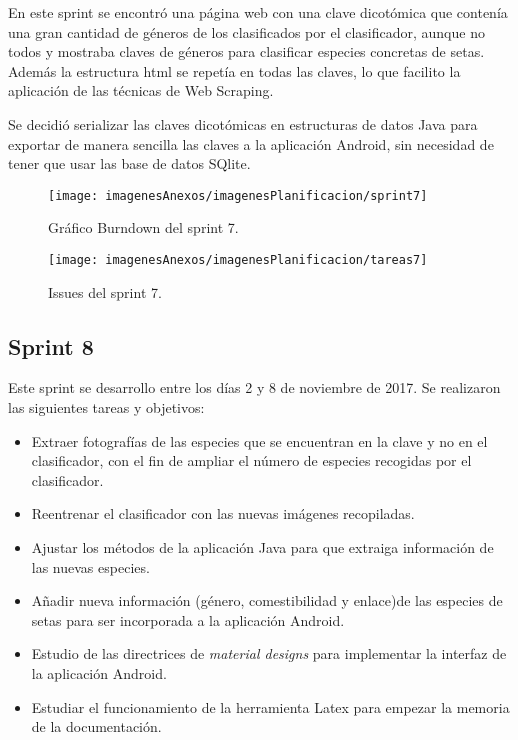 En este sprint se encontró una página web con una clave dicotómica que contenía una gran cantidad de géneros de los clasificados por el clasificador, aunque no todos y mostraba claves de géneros para clasificar especies concretas de setas. Además la estructura html se repetía en todas las claves, lo que facilito la aplicación de las técnicas de Web Scraping.

Se decidió serializar las claves dicotómicas en estructuras de datos Java para exportar de manera sencilla las claves a la aplicación Android, sin necesidad de tener que usar las base de datos SQlite.

\begin{figure}[h]
    \begin{center}%
        \begin{center}%
          \texttt{[image: imagenesAnexos/imagenesPlanificacion/sprint7]}%
          \caption{Gráfico Burndown del sprint 7.}%
          \label{figSprint7}%
        \end{center}%
  	\end{center}%
\end{figure}%

\begin{figure}[h]
    \begin{center}%
        \begin{center}%
          \texttt{[image: imagenesAnexos/imagenesPlanificacion/tareas7]}%
          \caption{Issues del sprint 7.}%
          \label{figTareas7}%
        \end{center}%
  	\end{center}%
\end{figure}%

\newpage

\subsection{Sprint 8}

Este sprint se desarrollo entre los días 2 y 8 de noviembre de 2017. Se realizaron las siguientes tareas y objetivos:

\begin{itemize}
	\item Extraer fotografías de las especies que se encuentran en la clave y no en el clasificador, con el fin de ampliar el número de especies recogidas por el clasificador.
	\item Reentrenar el clasificador con las nuevas imágenes recopiladas.
	\item Ajustar los métodos de la aplicación Java para que extraiga información de las nuevas especies.
	\item Añadir nueva información (género, comestibilidad y enlace)de las especies de setas para ser incorporada a la aplicación Android.
	\item Estudio de las directrices de \textit{material designs} para implementar la interfaz de la aplicación Android.
	\item Estudiar el funcionamiento de la herramienta Latex para empezar la memoria de la documentación.
\end{itemize}


